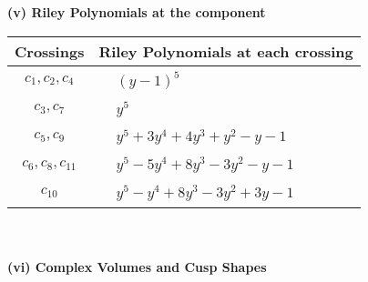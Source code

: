\documentclass[1p]{elsarticle_modified}
\theoremstyle{definition}
\begin{document}
\newpage\renewcommand{\arraystretch}{1}
\flushleft \textbf{(v) Riley Polynomials at the component}\newline \\
\begin{tabular}{m{50pt}|m{274pt}}
Crossings & \hspace{64pt}Riley Polynomials at each crossing \\
\hline $$\begin{aligned}c_{1},c_{2},c_{4}\end{aligned}$$&$\begin{aligned}
&(y-1)^5
\end{aligned}$\\
\hline $$\begin{aligned}c_{3},c_{7}\end{aligned}$$&$\begin{aligned}
&y^5
\end{aligned}$\\
\hline $$\begin{aligned}c_{5},c_{9}\end{aligned}$$&$\begin{aligned}
&y^5+3 y^4+4 y^3+y^2- y-1
\end{aligned}$\\
\hline $$\begin{aligned}c_{6},c_{8},c_{11}\end{aligned}$$&$\begin{aligned}
&y^5-5 y^4+8 y^3-3 y^2- y-1
\end{aligned}$\\
\hline $$\begin{aligned}c_{10}\end{aligned}$$&$\begin{aligned}
&y^5- y^4+8 y^3-3 y^2+3 y-1
\end{aligned}$\\
\hline
\end{tabular}\\~\\
\newpage\flushleft \textbf{(vi) Complex Volumes and Cusp Shapes}
\end{document}
